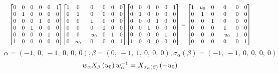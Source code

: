 \documentclass[11pt]{article}
\theoremstyle{definition}
\begin{document}
\[
\scaletoalign{\textwidth}{{\left[\begin{matrix}0 & 0 & 0 & 0 & 0 & 1\\0 & 1 & 0 & 0 & 0 & 0\\0 & 0 & 0 & 1 & 0 & 0\\0 & 0 & 1 & 0 & 0 & 0\\0 & 0 & 0 & 0 & 1 & 0\\1 & 0 & 0 & 0 & 0 & 0\end{matrix}\right]} {\left[\begin{matrix}1 & 0 & 0 & 0 & 0 & 0\\0 & 1 & 0 & 0 & 0 & 0\\0 & 0 & 1 & 0 & 0 & 0\\0 & 0 & 0 & 1 & 0 & 0\\0 & 0 & - u_{0} & 0 & 1 & 0\\0 & u_{0} & 0 & 0 & 0 & 1\end{matrix}\right]} {\left[\begin{matrix}0 & 0 & 0 & 0 & 0 & 1\\0 & 1 & 0 & 0 & 0 & 0\\0 & 0 & 0 & 1 & 0 & 0\\0 & 0 & 1 & 0 & 0 & 0\\0 & 0 & 0 & 0 & 1 & 0\\1 & 0 & 0 & 0 & 0 & 0\end{matrix}\right]} = {\left[\begin{matrix}1 & u_{0} & 0 & 0 & 0 & 0\\0 & 1 & 0 & 0 & 0 & 0\\0 & 0 & 1 & 0 & 0 & 0\\0 & 0 & 0 & 1 & 0 & 0\\0 & 0 & 0 & - u_{0} & 1 & 0\\0 & 0 & 0 & 0 & 0 & 1\end{matrix}\right]}}
\]
\[
\alpha = \left( -1, \  0, \  -1, \  0, \  0, \  0\right), \beta = \left( 0, \  -1, \  1, \  0, \  0, \  0\right), \sigma_{\alpha}(\beta) = \left( -1, \  -1, \  0, \  0, \  0, \  0\right)
\]
\[
\scaletoalign{\textwidth}{w_{\alpha} X_{\beta}\left(u_{0}\right) w_{\alpha}^{-1} = X_{\sigma_{\alpha}\left(\beta\right)}\left(- u_{0}\right)}
\]
\end{document}
